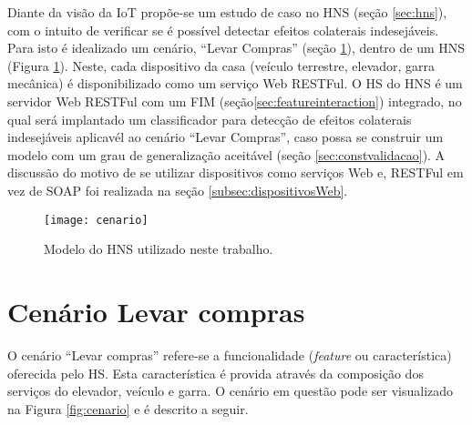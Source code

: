 Diante da visão da IoT propõe-se um estudo de caso no HNS (seção \ref{sec:hns}), com o intuito de verificar se é possível detectar efeitos colaterais indesejáveis. Para isto é idealizado um cenário, ``Levar Compras'' (seção \ref{sec:cenario}), dentro de um HNS (Figura \ref{fig:hnsworkmodel}). Neste, cada dispositivo da casa (veículo terrestre, elevador, garra mecânica) é disponibilizado como um serviço Web RESTFul. O HS do HNS é um servidor Web RESTFul com um FIM (seção\ref{sec:featureinteraction}) integrado, no qual será implantado um classificador para detecção de efeitos colaterais indesejáveis aplicavél ao cenário ``Levar Compras'', caso possa se construir um modelo com um grau de generalização aceitável (seção \ref{sec:constvalidacao}). A discussão do motivo de se utilizar dispositivos como serviços Web e, RESTFul em vez de SOAP foi realizada na seção \ref{subsec:dispositivosWeb}.

\begin{figure}[!htb] \centering 
  \centering
  \texttt{[image: cenario]} 
  \caption{Modelo do HNS utilizado neste trabalho.} 
  \label{fig:hnsworkmodel}
\end{figure}

\section{Cenário Levar compras}
\label{sec:cenario}
O cenário ``Levar compras'' refere-se a funcionalidade (\textit{feature} ou característica)  oferecida pelo HS. Esta característica é provida através da composição dos serviços do elevador, veículo e garra. O cenário em questão pode ser visualizado na Figura \ref{fig:cenario} e é descrito a seguir.

